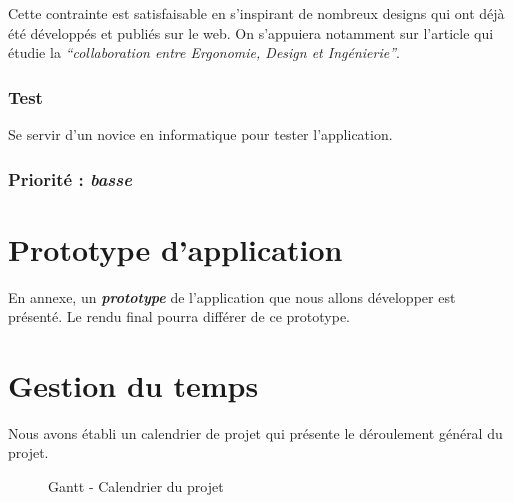 Cette contrainte est satisfaisable en s’inspirant de nombreux designs qui ont déjà été développés et publiés sur le web. On s’appuiera notamment sur l’article \cite{lente2014scenariser} qui étudie la \textit{“collaboration entre Ergonomie, Design et Ingénierie”}.

\subsubsection{Test}

Se servir d'un novice en informatique pour tester l’application.

\subsubsection{Priorité : \textit{basse}}


\section{Prototype d'application}

  En annexe, un \textbf{\textit{prototype}} de l'application que nous allons développer est présenté. Le rendu final pourra différer de ce prototype.


\section{Gestion du temps}
  
Nous avons établi un calendrier de projet qui présente le déroulement général du projet.

\begin{figure}[!h]
  \begin{center}
    \caption{\label{gantt} Gantt - Calendrier du projet}
  \end{center}   
\end{figure}


